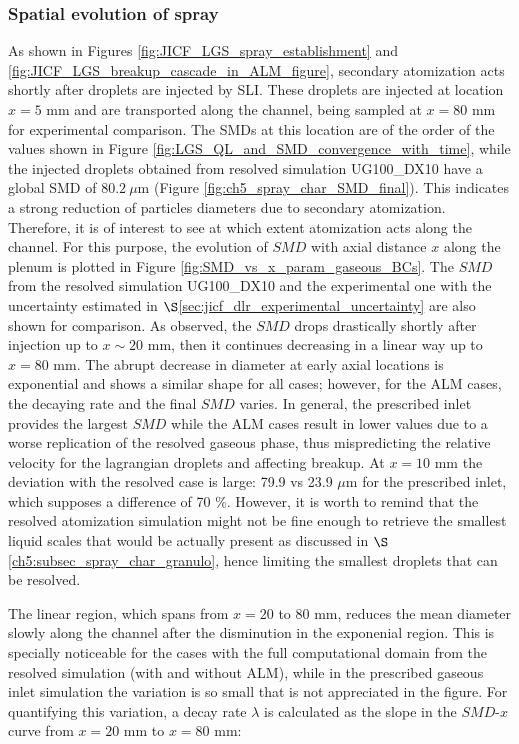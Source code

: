 \subsubsection*{Spatial evolution of spray}

As shown in Figures \ref{fig:JICF_LGS_spray_establishment} and \ref{fig:JICF_LGS_breakup_cascade_in_ALM_figure}, secondary atomization acts shortly after droplets are injected by SLI. These droplets are injected at location $x = 5$ mm and are transported along the channel, being sampled at $x = 80$ mm for experimental comparison. The SMDs at this location are of the order of the values shown in Figure \ref{fig:LGS_QL_and_SMD_convergence_with_time}, while the injected droplets obtained from resolved simulation UG100\_DX10 have a global SMD of $80.2~\mu$m (Figure \ref{fig:ch5_spray_char_SMD_final}). This indicates a strong reduction of particles diameters due to secondary atomization. Therefore, it is of interest to see at which extent atomization acts along the channel. For this purpose, the evolution of $SMD$ with axial distance $x$ along the plenum is plotted in Figure \ref{fig:SMD_vs_x_param_gaseous_BCs}. The $SMD$ from the resolved simulation UG100\_DX10 and the experimental one with the uncertainty estimated in $\S$\ref{sec:jicf_dlr_experimental_uncertainty} are also shown for comparison. As observed, the $SMD$ drops drastically shortly after injection up to $x \sim 20$ mm, then it continues decreasing in a linear way up to $x = 80$ mm. The abrupt decrease in diameter at early axial locations is exponential and shows a similar shape for all cases;  however, for the ALM cases, the decaying rate and the final $SMD$ varies. In general, the prescribed inlet provides the largest $SMD$ while the ALM cases result in lower values due to a worse replication of the resolved gaseous phase, thus mispredicting the relative velocity for the lagrangian droplets and affecting breakup. At $x = 10$ mm the deviation with the resolved case is large: 79.9 vs 23.9 $\mu$m for the prescribed inlet, which supposes a difference of 70 $\%$.  However, it is worth to remind that the resolved atomization simulation might not be fine enough to retrieve the smallest liquid scales that would be actually present as discussed in $\S$\ref{ch5:subsec_spray_char_granulo}, hence limiting the smallest droplets that can be resolved.

The linear region, which spans from $x = 20$ to $80$ mm, reduces the mean diameter slowly along the channel after the disminution in the exponenial region. This is specially noticeable for the cases with the full computational domain from the resolved simulation (with and without ALM), while in the prescribed gaseous inlet simulation the variation is so small that is not appreciated in the figure. For quantifying this variation, a decay rate $\lambda$ is calculated as the slope in the $SMD$-$x$ curve from $x =20$ mm to $x = 80$ mm:

